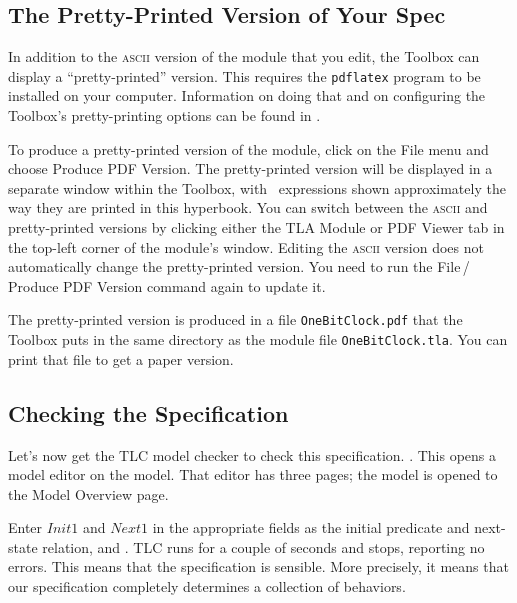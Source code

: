 \documentclass[fleqn,leqno]{article}
\begin{document}
  \vspace{-\baselineskip}%
\subsection{The Pretty-Printed Version of Your Spec}

In addition to the \textsc{ascii} version of the module that you edit,
the Toolbox can display a ``pretty-printed'' version.  This requires
the 
\texttt{pdflatex} program to be installed on your computer.
Information on doing that and on configuring the Toolbox's
pretty-printing options can be found in 
.

To produce a pretty-printed version of the module, click on the
\textsf{File} menu and choose \textsf{Produce PDF Version}.  The 
pretty-printed version will be displayed in a separate window within
the Toolbox, with \tlaplus\ expressions shown approximately the way
they are printed in this hyperbook.  You can switch
between the \textsc{ascii} and
pretty-printed versions by clicking either the \textsf{TLA Module} or
\textsf{PDF Viewer} tab in the top-left corner of the module's window.
Editing the \textsc{ascii} version does not automatically change the
pretty-printed version.  You need to run the
\textsf{File}\,/\,\textsf{Produce PDF Version} command again to update it.

The pretty-printed version is produced in a file
\texttt{OneBitClock.pdf} that the Toolbox puts in the same directory
as the module file \texttt{OneBitClock.tla}.  You can print that file
to get a paper version.

\subsection{Checking the Specification}

Let's now get the 
TLC model checker to check this specification.
.  This opens a 
model editor on the model.  That editor has three pages; the model is
opened to the \textsf{Model Overview} page.

Enter $Init1$ and $Next1$ in the appropriate fields as the initial
predicate and next-state relation, and \@.
TLC runs for a couple of seconds and stops, reporting no errors.  This
means that the specification is sensible.  More precisely, it means
that our specification completely determines a collection of
behaviors.
\end{document}

